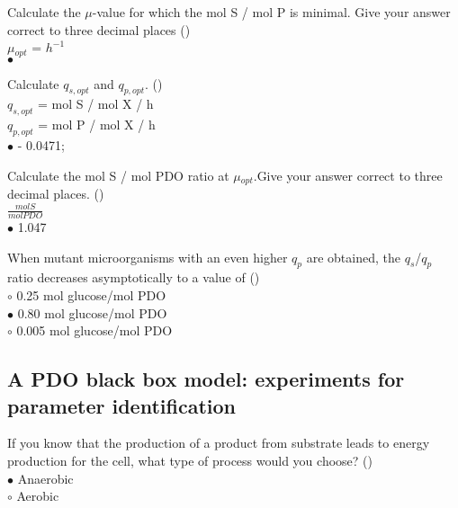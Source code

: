 \documentclass[]{beamer}
\begin{document}
\begin{frame}[shrink] {} 
\color{blue}
    Calculate the $\mu$-value for which the mol S / mol P is minimal. Give your answer correct to three decimal places ({\color{green}{Q4d}})\\
$\mu$$_{opt}$ = \underline{\quad } $h^{-1}$\\
\color{black}
\setlength{\parindent}{-0.4cm}
{\color{red}$\bullet$}  \\
\end{frame}


\begin{frame}[shrink] {} 
\color{blue}
    Calculate $q_{s,opt}$ and $q_{p,opt}$. ({\color{green}{Q4e}})\\
\color{black}
\setlength{\parindent}{-0.4cm}
$q_{s,opt}$ = \underline{\quad } mol S / mol X / h\\
$q_{p,opt}$ =\underline{\quad } mol P / mol X / h\\[0.5em]
{\color{red}$\bullet$}   - 0.0471; \\
\end{frame}


\begin{frame}[shrink] {} 
\color{blue}
    Calculate the mol S / mol PDO ratio at $\mu$$_{opt}$.Give your answer correct to three decimal places. ({\color{green}{Q4f}})\\
$\frac{mol S}{mol PDO}$\\
\color{black}
\setlength{\parindent}{-0.4cm}
{\color{red}$\bullet$}  1.047
\end{frame}


\begin{frame}[shrink] {} 
\color{blue}
    When mutant microorganisms with an even higher $q_{p}$ are obtained, the $q_{s}$/$q_{p}$ ratio decreases asymptotically to a value of  ({\color{green}{Q4g}})\\
\color{black}
\setlength{\parindent}{-0.4cm}
{\color{red}$\circ$}  0.25 mol glucose/mol PDO \\
{\color{red}$\bullet$}  0.80 mol glucose/mol PDO \\
{\color{red}$\circ$}  0.005 mol glucose/mol PDO \\
\end{frame}
\subsection{A PDO black box model: experiments for parameter identification}
\begin{frame}[shrink] {} 
\color{blue}
If you know that the production of a product from substrate leads to energy production for the cell, what type of process would you choose? ({\color{green}{Q1}})\\
\color{black}
\setlength{\parindent}{-0.4cm}
{\color{red}$\bullet$}  Anaerobic \\
{\color{red}$\circ$}  Aerobic \\
\end{frame}
\end{document}
